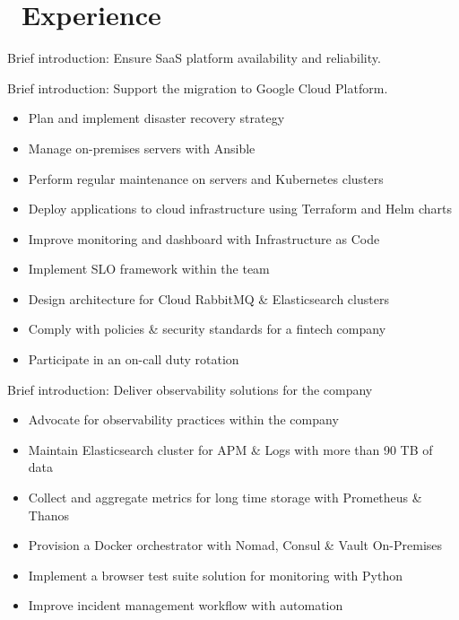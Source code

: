 \documentclass{resume}
\begin{document}
\begin{minipage}[t]{0.67\textwidth}

\section{\texorpdfstring{\textbf{}\ Experience}{Experience}}

Brief introduction: Ensure SaaS platform availability and reliability.

Brief introduction: Support the migration to Google Cloud Platform.
\begin{itemize}
  \item Plan and implement disaster recovery strategy
  \item Manage on-premises servers with Ansible
  \item Perform regular maintenance on servers and Kubernetes clusters
  \item Deploy applications to cloud infrastructure using Terraform and Helm charts
  \item Improve monitoring and dashboard with Infrastructure as Code
  \item Implement SLO framework within the team
  \item Design architecture for Cloud RabbitMQ \& Elasticsearch clusters
  \item Comply with policies \& security standards for a fintech company
  \item Participate in an on-call duty rotation
\end{itemize}

Brief introduction: Deliver observability solutions for the company
\begin{itemize}
  \item Advocate for observability practices within the company
  \item Maintain Elasticsearch cluster for APM \& Logs with more than 90 TB of data
  \item Collect and aggregate metrics for long time storage with Prometheus \& Thanos
  \item Provision a Docker orchestrator with Nomad, Consul \& Vault On-Premises
  \item Implement a browser test suite solution for monitoring with Python
  \item Improve incident management workflow with automation
\end{itemize}


\end{minipage}
\end{document}
